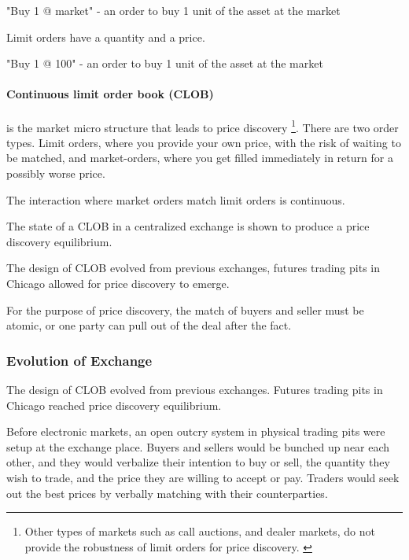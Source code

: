 \documentclass[12pt]{article}
\begin{document}
\begin{enumerate*}
    \item "Buy 1 @ market" - an order to buy 1 unit of the asset at the market  
\end{enumerate*}

Limit orders have a quantity and a price. 

\begin{enumerate*}
    \item "Buy 1 @ 100" - an order to buy 1 unit of the asset at the market  
\end{enumerate*}


\paragraph*{Continuous limit order book (CLOB)}is the market micro structure that leads to price discovery \footnote{Other types of markets such as call auctions, and dealer markets, do not provide the robustness of limit orders for price discovery. \cite{RePEc:hal:journl:hal-00459785}}. There are two order types. Limit orders, where you provide your own price, with the risk of waiting to be matched, and market-orders, where you get filled immediately in return for a possibly worse price.

The interaction where market orders match limit orders is continuous. 

The state of a CLOB in a centralized exchange is shown to produce a price discovery equilibrium. 

The design of CLOB evolved from previous exchanges, futures trading pits in Chicago allowed for price discovery to emerge. 

For the purpose of price discovery, the match of buyers and seller must be atomic, or one party can pull out of the deal after the fact. 


\subsubsection*{Evolution of Exchange}
The design of CLOB evolved from previous exchanges. Futures trading pits in Chicago reached price discovery equilibrium.  

Before electronic markets, an open outcry system in physical trading pits were setup at the exchange place. Buyers and sellers would be bunched up near each other, and they would verbalize their intention to buy or sell, the quantity they wish to trade, and the price they are willing to accept or pay. Traders would seek out the best prices by verbally matching with their counterparties. 
\end{document}
